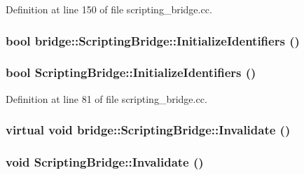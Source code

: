 Definition at line 150 of file scripting\_\-bridge.cc.

\hypertarget{classbridge_1_1_scripting_bridge_a86ef6533d8f6ed9573890f017c6084d9}{
\subsubsection[{InitializeIdentifiers}]{\setlength{\rightskip}{0pt plus 5cm}bool bridge::ScriptingBridge::InitializeIdentifiers ()}}
\label{classbridge_1_1_scripting_bridge_a86ef6533d8f6ed9573890f017c6084d9}
\hypertarget{classbridge_1_1_scripting_bridge_a05f2a65b751d12e6aeaa00bfd91ef83f}{
\subsubsection[{InitializeIdentifiers}]{\setlength{\rightskip}{0pt plus 5cm}bool ScriptingBridge::InitializeIdentifiers ()}}
\label{classbridge_1_1_scripting_bridge_a05f2a65b751d12e6aeaa00bfd91ef83f}


Definition at line 81 of file scripting\_\-bridge.cc.

\hypertarget{classbridge_1_1_scripting_bridge_a956430a5ae42b3e30c3e1b4655322061}{
\subsubsection[{Invalidate}]{\setlength{\rightskip}{0pt plus 5cm}virtual void bridge::ScriptingBridge::Invalidate ()}}
\label{classbridge_1_1_scripting_bridge_a956430a5ae42b3e30c3e1b4655322061}
\hypertarget{classbridge_1_1_scripting_bridge_af00ea5a26438b33f976734a3432dfa9b}{
\subsubsection[{Invalidate}]{\setlength{\rightskip}{0pt plus 5cm}void ScriptingBridge::Invalidate ()}}
\label{classbridge_1_1_scripting_bridge_af00ea5a26438b33f976734a3432dfa9b}


